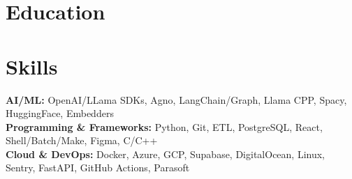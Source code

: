 \documentclass{../templates/simplecv}
\begin{document}
\section{Education}
\resumeItemListStart
{}
\resumeItemListEnd

\vspace{4pt}

\section{Skills}
\vspace{2pt}
\resumeSubHeadingListStart
\small{\item{
\textbf{AI/ML: }{OpenAI/LLama SDKs, Agno, LangChain/Graph, Llama CPP, Spacy, HuggingFace, Embedders} \\ \vspace{1pt}
\textbf{Programming \& Frameworks: }{Python, Git, ETL, PostgreSQL, React, Shell/Batch/Make, Figma, C/C++} \\ \vspace{1pt}
\textbf{Cloud \& DevOps: }{Docker, Azure, GCP, Supabase, DigitalOcean, Linux, Sentry, FastAPI, GitHub Actions, Parasoft} \\
}}
\resumeSubHeadingListEnd
\end{document}
